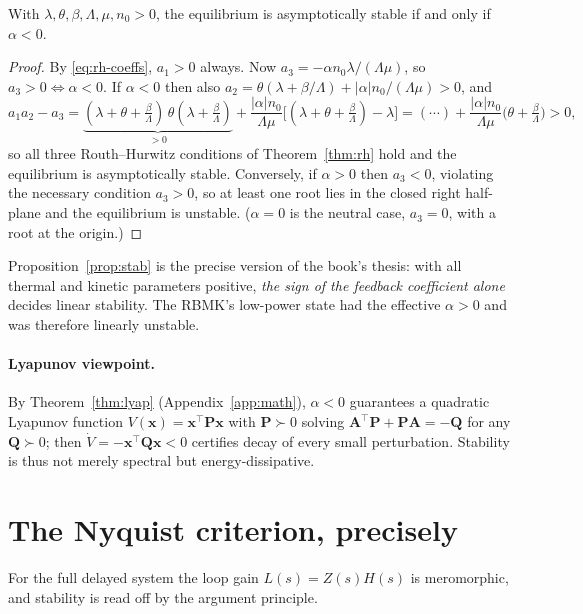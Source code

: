 \begin{proposition}
\label{prop:stab}
With $\lambda,\theta,\beta,\Lambda,\mu,n_0>0$, the equilibrium is asymptotically
stable if and only if $\alpha<0$.
\end{proposition}
\begin{proof}
By \eqref{eq:rh-coeffs}, $a_1>0$ always. Now $a_3=-\alpha n_0\lambda/(\Lambda\mu)$,
so $a_3>0\iff\alpha<0$. If $\alpha<0$ then also $a_2=\theta(\lambda+\beta/\Lambda)
+|\alpha|n_0/(\Lambda\mu)>0$, and
\[
a_1a_2-a_3
=\underbrace{(\lambda+\theta+\tfrac{\beta}{\Lambda})\,\theta(\lambda+\tfrac{\beta}{\Lambda})}_{>0}
+\frac{|\alpha|n_0}{\Lambda\mu}\Big[(\lambda+\theta+\tfrac{\beta}{\Lambda})-\lambda\Big]
=(\cdots)+\frac{|\alpha|n_0}{\Lambda\mu}\Big(\theta+\tfrac{\beta}{\Lambda}\Big)>0,
\]
so all three Routh--Hurwitz conditions of Theorem~\ref{thm:rh} hold and the
equilibrium is asymptotically stable. Conversely, if $\alpha>0$ then $a_3<0$,
violating the necessary condition $a_3>0$, so at least one root lies in the closed
right half-plane and the equilibrium is unstable. ($\alpha=0$ is the neutral case,
$a_3=0$, with a root at the origin.)
\end{proof}

Proposition~\ref{prop:stab} is the precise version of the book's thesis: with all
thermal and kinetic parameters positive, \emph{the sign of the feedback
coefficient alone} decides linear stability. The RBMK's low-power state had the
effective $\alpha>0$ and was therefore linearly unstable.

\paragraph{Lyapunov viewpoint.}
By Theorem~\ref{thm:lyap} (Appendix~\ref{app:math}), $\alpha<0$ guarantees a
quadratic Lyapunov function $V(\mathbf x)=\mathbf x^{\!\top}\mathbf P\mathbf x$ with
$\mathbf P\succ0$ solving $\mathbf A^{\!\top}\mathbf P+\mathbf P\mathbf A=-\mathbf
Q$ for any $\mathbf Q\succ0$; then $\dot V=-\mathbf x^{\!\top}\mathbf Q\mathbf x<0$
certifies decay of every small perturbation. Stability is thus not merely
spectral but energy-dissipative.

\section{The Nyquist criterion, precisely}
\label{sec:nyquist-precise}

For the full delayed system the loop gain $L(s)=Z(s)H(s)$ is meromorphic, and
stability is read off by the argument principle.

